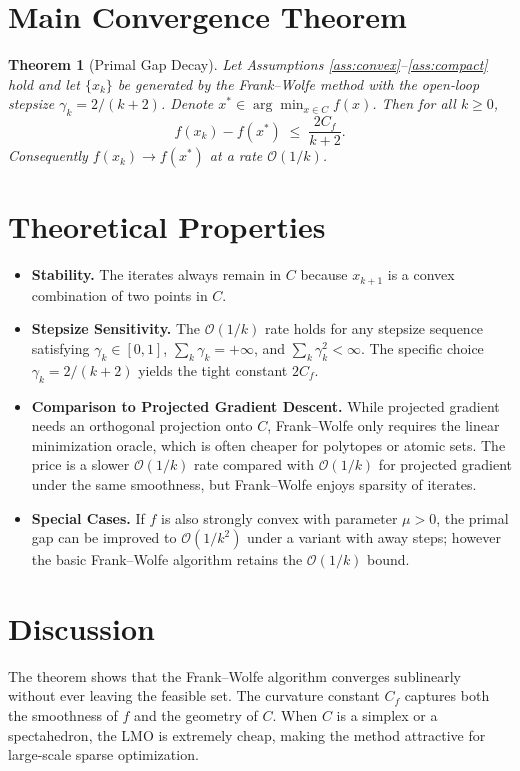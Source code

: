 \documentclass{article}
\newtheorem{theorem}{Theorem}
\begin{document}
\section*{Main Convergence Theorem}
\begin{theorem}[Primal Gap Decay]\label{thm:fw}
Let Assumptions \ref{ass:convex}–\ref{ass:compact} hold and let $\{x_{k}\}$ be generated by the Frank–Wolfe method with the open‑loop stepsize $\gamma_{k}=2/(k+2)$.  
Denote $x^{*}\in\arg\min_{x\in C}f(x)$. Then for all $k\ge0$,
\[
f(x_{k})-f(x^{*})\;\le\;\frac{2C_{f}}{k+2}.
\tag{3}
\]
Consequently $f(x_{k})\to f(x^{*})$ at a rate $\mathcal{O}(1/k)$.
\end{theorem}

\section*{Theoretical Properties}
\begin{itemize}[leftmargin=*]
\item \textbf{Stability.} The iterates always remain in $C$ because $x_{k+1}$ is a convex combination of two points in $C$.
\item \textbf{Stepsize Sensitivity.} The $\mathcal{O}(1/k)$ rate holds for any stepsize sequence satisfying $\gamma_{k}\in[0,1]$, $\sum_{k}\gamma_{k}=+\infty$, and $\sum_{k}\gamma_{k}^{2}<\infty$. The specific choice $\gamma_{k}=2/(k+2)$ yields the tight constant $2C_{f}$.
\item \textbf{Comparison to Projected Gradient Descent.} While projected gradient needs an orthogonal projection onto $C$, Frank–Wolfe only requires the linear minimization oracle, which is often cheaper for polytopes or atomic sets. The price is a slower $\mathcal{O}(1/k)$ rate compared with $\mathcal{O}(1/k)$ for projected gradient under the same smoothness, but Frank–Wolfe enjoys sparsity of iterates.
\item \textbf{Special Cases.} If $f$ is also strongly convex with parameter $\mu>0$, the primal gap can be improved to $\mathcal{O}(1/k^{2})$ under a variant with away steps; however the basic Frank–Wolfe algorithm retains the $\mathcal{O}(1/k)$ bound.
\end{itemize}

\section*{Discussion}
The theorem shows that the Frank–Wolfe algorithm converges sublinearly without ever leaving the feasible set. The curvature constant $C_{f}$ captures both the smoothness of $f$ and the geometry of $C$. When $C$ is a simplex or a spectahedron, the LMO is extremely cheap, making the method attractive for large‑scale sparse optimization.
\end{document}
